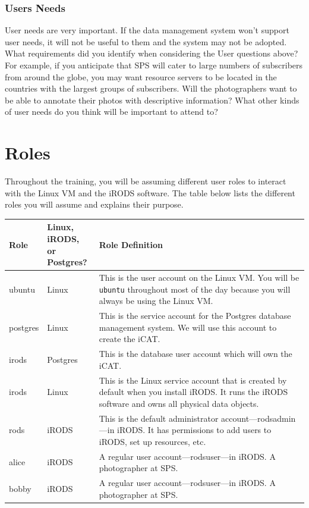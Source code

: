 \documentclass[10pt,oneside]{memoir}
\begin{document}
\subsection{Users Needs}

User needs are very important. If the data management system won't support user needs, it will not be useful to them and the system may not be adopted. What requirements did you identify when considering the User questions above? For example, if you anticipate that SPS will cater to large numbers of subscribers from around the globe, you may want resource servers to be located in the countries with the largest groups of subscribers. Will the photographers want to be able to annotate their photos with descriptive information? What other kinds of user needs do you think will be important to attend to?

\chapter{Roles}

Throughout the training, you will be assuming different user roles to interact with the Linux VM and the iRODS software. The table below lists the different roles you will assume and explains their purpose.

\begin{center}
\def\arraystretch{1.7}%
\begin{tabular}{ |l|l|p{11cm}| }
\hline
Role & \makecell[c]{Linux, \\ iRODS, \\ or Postgres?} & Role Definition \\
\hline
ubuntu & Linux & This is the user account on the Linux VM. You will be \texttt{ubuntu} throughout most of the day because you will always be using the Linux VM. \\
postgres & Linux & This is the service account for the Postgres database management system. We will use this account to create the iCAT. \\
irods & Postgres & This is the database user account which will own the iCAT. \\
irods & Linux & This is the Linux service account that is created by default when you install iRODS. It runs the iRODS software and owns all physical data objects. \\
rods & iRODS & This is the default administrator account---rodsadmin---in iRODS. It has permissions to add users to iRODS, set up resources, etc. \\
alice & iRODS & A regular user account---rodsuser---in iRODS. A photographer at SPS. \\
bobby & iRODS & A regular user account---rodsuser---in iRODS. A photographer at SPS. \\
\hline
\end{tabular}
\end{center}
\end{document}
